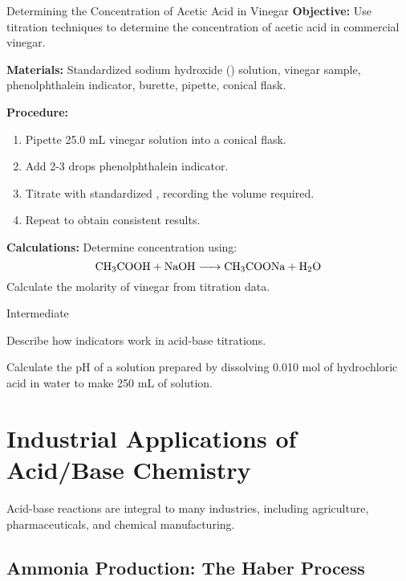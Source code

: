 \begin{investigation}{Determining the Concentration of Acetic Acid in Vinegar}
\textbf{Objective:} Use titration techniques to determine the concentration of acetic acid in commercial vinegar.

\textbf{Materials:} Standardized sodium hydroxide () solution, vinegar sample, phenolphthalein indicator, burette, pipette, conical flask.

\textbf{Procedure:}
\begin{enumerate}
\item Pipette 25.0 mL vinegar solution into a conical flask.
\item Add 2-3 drops phenolphthalein indicator.
\item Titrate with standardized , recording the volume required.
\item Repeat to obtain consistent results.
\end{enumerate}

\textbf{Calculations:} Determine concentration using:
\[
\ce{CH3COOH + NaOH -> CH3COONa + H2O}
\]
Calculate the molarity of vinegar from titration data.
\end{investigation}

\begin{tieredquestions}{Intermediate}
\item Describe how indicators work in acid-base titrations.
\item Calculate the pH of a solution prepared by dissolving 0.010 mol of hydrochloric acid in water to make 250 mL of solution.
\end{tieredquestions}

\FloatBarrier

\section{Industrial Applications of Acid/Base Chemistry}
\FloatBarrier
\FloatBarrier
\FloatBarrier

Acid-base reactions are integral to many industries, including agriculture, pharmaceuticals, and chemical manufacturing.

\subsection{Ammonia Production: The Haber Process}
\FloatBarrier
\FloatBarrier
\FloatBarrier
{}

